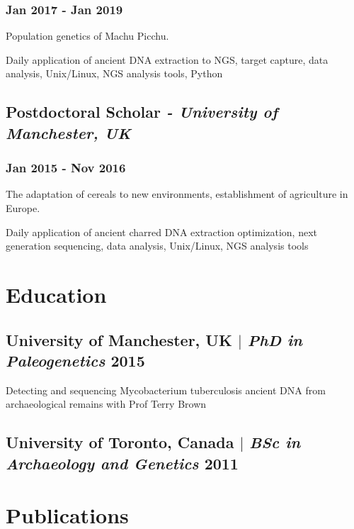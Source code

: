 \documentclass[11pt]{article}
\begin{document}
\subsubsection{Jan 2017 - Jan 2019}
\begin{description}[leftmargin=5pt]
    \item Population genetics of Machu Picchu.
    \item Daily application of ancient DNA extraction to NGS, target capture, data analysis, Unix/Linux, NGS analysis tools, Python
\end{description}
\bigskip

\subsection{Postdoctoral Scholar \normalfont\textit{- University of Manchester, UK}}
\subsubsection{Jan 2015 - Nov 2016}
\begin{description}[leftmargin=5pt]
    \item The adaptation of cereals to new environments, establishment of agriculture in Europe.
    \item Daily application of ancient charred DNA extraction optimization, next generation sequencing, data analysis, Unix/Linux, NGS analysis tools
\end{description}


\section{Education}
\bigskip
\subsection{University of Manchester, UK $|$ {\normalfont\textit{PhD in Paleogenetics} \hfill 2015}}
\begin{description}[leftmargin=5pt]
    \item Detecting and sequencing Mycobacterium tuberculosis ancient DNA from archaeological remains with Prof Terry
Brown
\end{description}

\subsection{University of Toronto, Canada $|$ {\normalfont\textit{BSc in Archaeology and Genetics} \hfill 2011}}
\bigskip
\bigskip



\section{Publications}

\nocite{*}
\printbibliography[heading=none]
\vspace{-5pt}



\end{document}
